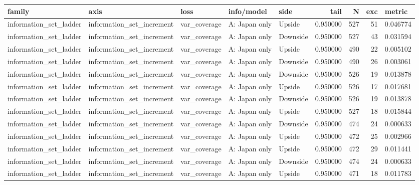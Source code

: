 \begin{tabular}{lllllrrr}
\toprule
family & axis & loss & info/model & side & tail & N & exc & metric \\
\midrule
information\_set\_ladder & information\_set\_increment & var\_coverage & A: Japan only & Upside & 0.950000 & 527 & 51 & 0.046774 \\
information\_set\_ladder & information\_set\_increment & var\_coverage & A: Japan only & Downside & 0.950000 & 527 & 43 & 0.031594 \\
information\_set\_ladder & information\_set\_increment & var\_coverage & A: Japan only & Upside & 0.950000 & 490 & 22 & 0.005102 \\
information\_set\_ladder & information\_set\_increment & var\_coverage & A: Japan only & Downside & 0.950000 & 490 & 26 & 0.003061 \\
information\_set\_ladder & information\_set\_increment & var\_coverage & A: Japan only & Downside & 0.950000 & 526 & 19 & 0.013878 \\
information\_set\_ladder & information\_set\_increment & var\_coverage & A: Japan only & Upside & 0.950000 & 526 & 17 & 0.017681 \\
information\_set\_ladder & information\_set\_increment & var\_coverage & A: Japan only & Downside & 0.950000 & 526 & 19 & 0.013878 \\
information\_set\_ladder & information\_set\_increment & var\_coverage & A: Japan only & Upside & 0.950000 & 527 & 18 & 0.015844 \\
information\_set\_ladder & information\_set\_increment & var\_coverage & A: Japan only & Downside & 0.950000 & 474 & 24 & 0.000633 \\
information\_set\_ladder & information\_set\_increment & var\_coverage & A: Japan only & Upside & 0.950000 & 472 & 25 & 0.002966 \\
information\_set\_ladder & information\_set\_increment & var\_coverage & A: Japan only & Upside & 0.950000 & 472 & 29 & 0.011441 \\
information\_set\_ladder & information\_set\_increment & var\_coverage & A: Japan only & Downside & 0.950000 & 474 & 24 & 0.000633 \\
information\_set\_ladder & information\_set\_increment & var\_coverage & A: Japan only & Upside & 0.950000 & 471 & 18 & 0.011783 \\

\end{tabular}
